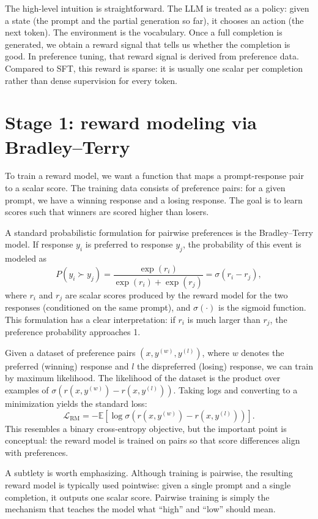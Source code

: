 The high-level intuition is straightforward. The LLM is treated as a policy: given a state (the prompt and the partial generation so far), it chooses an action (the next token). The environment is the vocabulary. Once a full completion is generated, we obtain a reward signal that tells us whether the completion is good. In preference tuning, that reward signal is derived from preference data. Compared to SFT, this reward is sparse: it is usually one scalar per completion rather than dense supervision for every token.

\section{Stage 1: reward modeling via Bradley--Terry}
To train a reward model, we want a function that maps a prompt-response pair to a scalar score. The training data consists of preference pairs: for a given prompt, we have a winning response and a losing response. The goal is to learn scores such that winners are scored higher than losers.

A standard probabilistic formulation for pairwise preferences is the Bradley--Terry model. If response \(y_i\) is preferred to response \(y_j\), the probability of this event is modeled as
\[
P(y_i \succ y_j) = \frac{\exp(r_i)}{\exp(r_i) + \exp(r_j)} = \sigma(r_i - r_j),
\]
where \(r_i\) and \(r_j\) are scalar scores produced by the reward model for the two responses (conditioned on the same prompt), and \(\sigma(\cdot)\) is the sigmoid function. This formulation has a clear interpretation: if \(r_i\) is much larger than \(r_j\), the preference probability approaches 1.

Given a dataset of preference pairs \((x, y^{(w)}, y^{(l)})\), where \(w\) denotes the preferred (winning) response and \(l\) the dispreferred (losing) response, we can train by maximum likelihood. The likelihood of the dataset is the product over examples of \(\sigma(r(x,y^{(w)}) - r(x,y^{(l)}))\). Taking logs and converting to a minimization yields the standard loss:
\[
\mathcal{L}_{\text{RM}} = -\mathbb{E}\left[\log \sigma\left(r(x,y^{(w)}) - r(x,y^{(l)})\right)\right].
\]
This resembles a binary cross-entropy objective, but the important point is conceptual: the reward model is trained on pairs so that score differences align with preferences.

A subtlety is worth emphasizing. Although training is pairwise, the resulting reward model is typically used pointwise: given a single prompt and a single completion, it outputs one scalar score. Pairwise training is simply the mechanism that teaches the model what “high” and “low” should mean.

